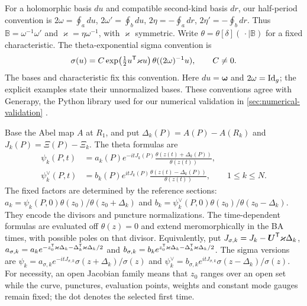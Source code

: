 For a holomorphic basis $du$ and compatible second-kind basis $dr$,
our half-period convention is $2\omega=\oint_a du$,
$2\omega'=\oint_b du$, $2\eta=-\oint_a dr$,
$2\eta'=-\oint_b dr$. Thus $\mathbb B=\omega^{-1}\omega'$ and
$\varkappa=\eta\omega^{-1}$, with $\varkappa$ symmetric.
Write $\theta=\theta[\delta](\,\cdot\mid\mathbb B)$ for a fixed
characteristic. The theta-exponential sigma convention is
\cite{BEL1997,KorotkinShramchenko2012}
\[
 \sigma(u)=C\exp\!\left(\tfrac12u^{\mathsf T}\varkappa u\right)
 \theta((2\omega)^{-1}u),\qquad C\ne0.
\]
The bases and characteristic fix this convention. Here
$du=\boldsymbol\omega$ and $2\omega=\mathrm{Id}_g$; the explicit examples
state their unnormalized bases. These conventions agree with Generapy,
the Python library used for our numerical validation in
\cref{sec:numerical-validation} \cite{Generapy}.

Base the Abel map $A$ at $R_1$, and put
$\Delta_k(P)=A(P)-A(R_k)$ and $J_k(P)=\Xi(P)-\Xi_k$.
The theta formulas are
\begin{equation}\label{eq:multipoint-BA-theta}
\begin{aligned}
 \psi_k(P,t)&=a_k(P)e^{-itJ_k(P)}
       \frac{\theta(z(t)+\Delta_k(P))}{\theta(z(t))},\\
 \psi_k^\vee(P,t)&=b_k(P)e^{itJ_k(P)}
       \frac{\theta(z(t)-\Delta_k(P))}{\theta(z(t))},
       \qquad1\leq k\leq N.
\end{aligned}
\end{equation}
The fixed factors are determined by the reference sections:
$a_k=\psi_k(P,0)\theta(z_0)/\theta(z_0+\Delta_k)$ and
$b_k=\psi_k^\vee(P,0)\theta(z_0)/\theta(z_0-\Delta_k)$.
They encode the divisors and puncture normalizations. The time-dependent
formulas are evaluated off $\theta(z)=0$ and extend meromorphically
in the BA times, with possible poles on that divisor.
Equivalently, put $J_{\sigma,k}=J_k-\boldsymbol U^{\mathsf T}\varkappa\Delta_k$,
$a_{\sigma,k}=a_k e^{-z_0^{\mathsf T}\varkappa\Delta_k-\Delta_k^{\mathsf T}\varkappa\Delta_k/2}$
and
$b_{\sigma,k}=b_k e^{z_0^{\mathsf T}\varkappa\Delta_k-\Delta_k^{\mathsf T}\varkappa\Delta_k/2}$.
The sigma versions are
$\psi_k=a_{\sigma,k}e^{-itJ_{\sigma,k}}\sigma(z+\Delta_k)/\sigma(z)$ and
$\psi_k^\vee=b_{\sigma,k}e^{itJ_{\sigma,k}}\sigma(z-\Delta_k)/\sigma(z)$.
For necessity, an open Jacobian family means that $z_0$ ranges over
an open set while the curve, punctures, evaluation points, weights and
constant mode gauges remain fixed; the dot denotes the selected first time.

